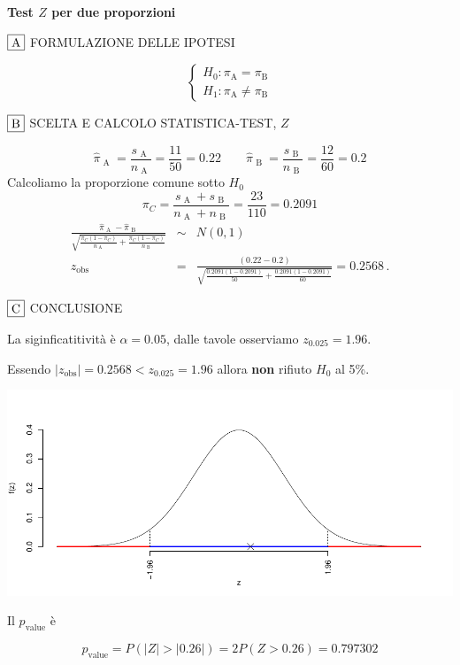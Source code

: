 \documentclass[
  11pt,
]{book}
\theoremstyle{mytheoremstyle}
\theoremstyle{mydefstyle}
\begin{document}
\textbf{Test \(Z\) per due proporzioni}

\(\fbox{A}\) FORMULAZIONE DELLE IPOTESI

\[\begin{cases}
   H_0: \pi_\text{A} = \pi_\text{B} \\
   H_1: \pi_\text{A} \neq \pi_\text{B} 
   \end{cases}\]

\(\fbox{B}\) SCELTA E CALCOLO STATISTICA-TEST, \(Z\)

\[\hat\pi_\text{ A }=\frac{s_\text{ A }}{n_\text{ A }}=\frac{ 11 }{ 50 }= 0.22 \qquad
   \hat\pi_\text{ B }=\frac{s_\text{ B }}{n_\text{ B }}=\frac{ 12 }{ 60 }= 0.2 \]Calcoliamo la proporzione comune sotto \(H_0\)
\[
     \pi_C=\frac{s_\text{ A }+s_\text{ B }}{n_\text{ A }+n_\text{ B }}=
     \frac{ 23 }{ 110 }= 0.2091 
   \]\begin{eqnarray*}
   \frac{\hat\pi_\text{ A } - \hat\pi_\text{ B }}
   {\sqrt{\frac {\pi_C(1-\pi_C)}{n_\text{ A }}+\frac {\pi_C(1-\pi_C)}{n_\text{ B }}}}&\sim&N(0,1)\\
   z_{\text{obs}}
   &=& \frac{ ( 0.22 -  0.2 )} {\sqrt{\frac{ 0.2091 (1- 0.2091 )}{ 50 }+\frac{ 0.2091 (1- 0.2091 )}{ 60 }}}
   =   0.2568 \, .
   \end{eqnarray*}

\(\fbox{C}\) CONCLUSIONE

La siginficatitività è \(\alpha=0.05\), dalle tavole osserviamo \(z_{0.025}=1.96\).

Essendo \(|z_\text{obs}|=0.2568<z_{0.025}=1.96\) allora \textbf{non} rifiuto \(H_0\) al 5\%.

\begin{center}\includegraphics{Appunti_di_Statistica_2025_files/figure-latex/25-test-functions-10-10} \end{center}

Il \(p_{\text{value}}\) è

\[ p_{\text{value}} = P(|Z|>|0.26|)=2P(Z>0.26)=0.797302 \]
\end{document}
